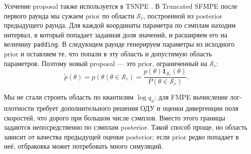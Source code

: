 Усечение proposal также используется в TSNPE \cite{deistler2022tsnpe}.
В Truncated SFMPE после первого раунда мы сужаем prior по области
$\mathcal S_r$, построенной из posterior предыдущего раунда. Для каждой
координаты параметра по сэмплам находим интервал, в который попадает
заданная доля значений, и расширяем его на величину \texttt{padding}.
В следующем раунде генерируем параметры из исходного prior и оставляем
те, что попали в эту область и допустимую область параметров. Поэтому
новый proposal — это prior,
ограниченный на $\mathcal S_r$:
\[
\tilde p(\theta)
=p(\theta\mid\theta\in\mathcal S_r)
=\frac{p(\theta)\mathbf 1_{\mathcal S_r}(\theta)}
{P(\theta\in\mathcal S_r)}.
\]

Мы не стали строить область по квантилям $\log q_\phi$: для FMPE вычисление
лог-плотности требует дополнительного решения ОДУ и оценки дивергенции
поля скоростей, что дорого при большом числе сэмплов. Вместо этого границы
задаются непосредственно по сэмплам posterior. Такой способ проще, но
область зависит от качества предыдущей оценки posterior; если prior редко
попадает в неё, отбраковка может потребовать много симуляций.
